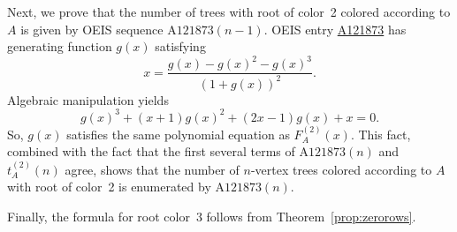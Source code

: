 \documentclass[12pt]{amsart}
\newcommand{\seqnum}[1]{\href{https://oeis.org/#1}{#1}}
\newcommand{\gff}[2]{F_{#2}^{(#1)}(x)}
\newcommand{\gfa}[1]{\gff{#1}{A}}
\begin{document}
\begin{description}
    Next, we prove that the number of trees with root of color~2 colored according to $A$ is given by OEIS sequence $\text{A121873}(n-1)$.
    OEIS entry \seqnum{A121873} has generating function $g(x)$ satisfying
    \[
    x = \frac{g(x) - g(x)^2 - g(x)^3}{(1+g(x))^2}.
    \]
    Algebraic manipulation yields
    \[
    g(x)^3+(x + 1)g(x)^2+(2x - 1)g(x)+x=0.
    \]
    So, $g(x)$ satisfies the same polynomial equation as $\gfa{2}$. This fact, combined with the fact that the first several terms of $\text{A121873}(n)$ and $t_A^{(2)}(n)$ agree, shows that the number of $n$-vertex trees colored according to $A$ with root of color~2 is enumerated by $\text{A121873}(n)$.

    Finally, the formula for root color~$3$ follows from Theorem~\ref{prop:zerorows}.
\end{description}
\end{document}
